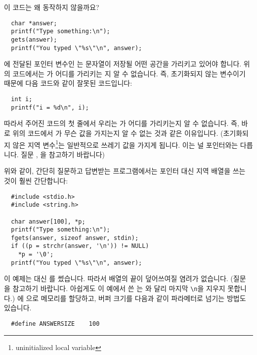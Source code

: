 \begin{faq}
	이 코드는 왜 동작하지 않을까요?
\begin{verbatim}
  char *answer;
  printf("Type something:\n");
  gets(answer);
  printf("You typed \"%s\"\n", answer);
\end{verbatim}

\A
	에 전달된 포인터 변수인 는 문자열이
	저장될 어떤 공간을 가리키고 있어야 합니다.  위의 코드에서는
	가 어디를 가리키는 지 알 수 없습니다. 즉, 초기화되지
	않는 변수이기 때문에 다음 코드와 같이 잘못된 코드입니다:

\begin{verbatim}
  int i;
  printf("i = %d\n", i);
\end{verbatim}

	따라서 주어진 코드의 첫 줄에서 우리는 가 어디를
	가리키는지 알 수 없습니다. 즉, 바로 위의 코드에서 가
	무슨 값을 가지는지 알 수 없는 것과 같은 이유입니다.
	(초기화되지 않은 지역 변수\footnote{uninitialized local variable}는
	일반적으로
	쓰레기 값을 가지게 됩니다.  이는 널 포인터와는 다릅니다.  질문
	, 을 참고하기 바랍니다)

	위와 같이, 간단히 질문하고 답변받는 프로그램에서는 포인터 대신
	지역 배열을 쓰는 것이 훨씬 간단합니다:

\begin{verbatim}
  #include <stdio.h>
  #include <string.h>

  char answer[100], *p;
  printf("Type something:\n");
  fgets(answer, sizeof answer, stdin);
  if ((p = strchr(answer, '\n')) != NULL)
    *p = '\0';
  printf("You typed \"%s\"\n", answer);
\end{verbatim}

	\noindent 이 예제는  대신 를 썼습니다.
	따라서 배열의 끝이 덮어쓰여질 염려가 없습니다.  (질문 을
	참고하기 바랍니다.  아쉽게도 이 예에서 쓴  는
	와 달리 마지막 \verb+\n+을 지우지 못합니다.)
	에
	으로 메모리를 할당하고, 버퍼 크기를 다음과 같이
	파라메터로 넘기는 방법도 있습니다.
\begin{verbatim}
  #define ANSWERSIZE    100
\end{verbatim}
\end{faq}

